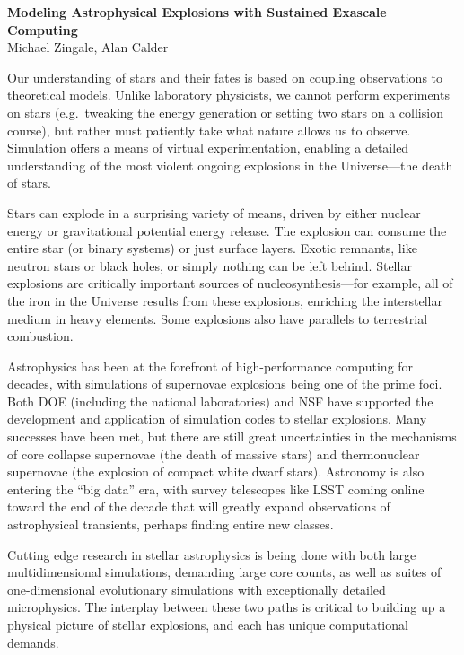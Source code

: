 \documentclass[11pt,twocolumn]{article}
\begin{document}
\begin{center}
{\sffamily \bfseries \large Modeling Astrophysical Explosions with Sustained Exascale Computing} \\
Michael Zingale\footnotemark[1], Alan Calder\footnotemark[1]
\end{center}


Our understanding of stars and their fates is based on coupling
observations to theoretical models.  Unlike laboratory physicists, we
cannot perform experiments on stars (e.g.\ tweaking the energy
generation or setting two stars on a collision course), but rather must
patiently take what nature allows us to observe.  Simulation offers a means
of virtual experimentation, enabling a detailed understanding of the
most violent ongoing explosions in the Universe---the death of stars.

Stars can explode in a surprising variety of means, driven by either
nuclear energy or gravitational potential energy release.  The
explosion can consume the entire star (or binary systems) or just
surface layers.  Exotic remnants, like neutron stars or black holes, or
simply nothing can be left behind.  Stellar explosions are critically
important sources of nucleosynthesis---for example, all of the iron in
the Universe results from these explosions, enriching the interstellar
medium in heavy elements.  Some explosions also have parallels to
terrestrial combustion.

Astrophysics has been at the forefront of high-performance computing
for decades, with simulations of supernovae explosions being one of
the prime foci.  Both DOE (including the national laboratories) and
NSF have supported the development and application of simulation codes
to stellar explosions.  Many successes have been met, but there are
still great uncertainties in the mechanisms of core collapse
supernovae (the death of massive stars) and thermonuclear supernovae
(the explosion of compact white dwarf stars).  Astronomy is also
entering the ``big data'' era, with survey telescopes like LSST coming
online toward the end of the decade that will greatly expand
observations of astrophysical transients, perhaps finding entire new
classes.

Cutting edge research in stellar astrophysics is being done with
both large multidimensional simulations, demanding large core counts,
as well as suites of one-dimensional evolutionary simulations with
exceptionally detailed microphysics.  The interplay between these
two paths is critical to building up a physical picture of stellar
explosions, and each has unique computational demands.
\end{document}
